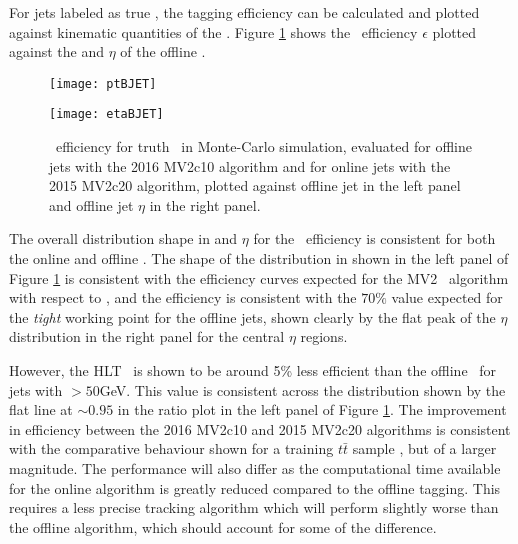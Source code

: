 	For jets labeled as true \bjets, the tagging efficiency can be calculated and plotted against kinematic quantities of the \bjets. Figure \ref{fig:MC:bjetefficiency} shows the \btag\ efficiency $\epsilon$ plotted against the \pt and $\eta$ of the offline \bjet.

		\begin{figure}[h]
			\centering
			\begin{minipage}[h]{0.48\linewidth}
				\texttt{[image: ptBJET]}

			\end{minipage}
			\quad
			\begin{minipage}[h]{0.48\linewidth}
				\texttt{[image: etaBJET]}
			\end{minipage}
			\caption[Comparison of \bjet\ tagging efficiency on truth \bjets\ between online and offline jets in Monte-Carlo simulation]{\btag\, efficiency for truth \bjets\, in Monte-Carlo simulation, evaluated for offline jets with the 2016 MV2c10 algorithm and for online jets with the 2015 MV2c20 algorithm, plotted against offline jet \pt in the left panel and offline jet $\eta$ in the right panel.}
			\label{fig:MC:bjetefficiency}
		\end{figure}

		The overall distribution shape in \pt and $\eta$ for the \btag\ efficiency is consistent for both the online and offline \bjet. The shape of the distribution in \pt shown in the left panel of Figure \ref{fig:MC:bjetefficiency} is consistent with the efficiency curves expected for the MV2 \btag\ algorithm with respect to \pt \cite{btagOptimisation}, and the efficiency is consistent with the $70\%$ value expected for the \textit{tight} working point for the offline jets, shown clearly by the flat peak of the $\eta$ distribution in the right panel for the central $\eta$ regions.

		However, the HLT \btag\, is shown to be around 5\% less efficient than the offline \btag\, for jets with \pt$>50$GeV. This value is consistent across the \pt distribution shown by the flat line at $\sim0.95$ in the ratio plot in the left panel of Figure \ref{fig:MC:bjetefficiency}. The improvement in efficiency between the 2016 MV2c10 and 2015 MV2c20 algorithms is consistent with the comparative behaviour shown for a training $t\bar{t}$ sample \cite{btagOptimisation}, but of a larger magnitude. The performance will also differ as the computational time available for the online algorithm is greatly reduced compared to the offline tagging. This requires a less precise tracking algorithm which will perform slightly worse than the offline algorithm, which should account for some of the difference.

